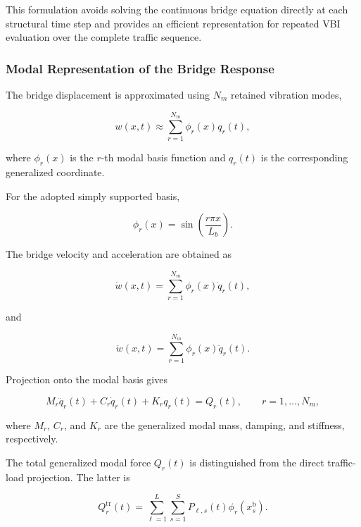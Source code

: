 \documentclass[journal]{IEEEtran}
\begin{document}
This formulation avoids
solving the continuous bridge equation directly at each structural time step
and provides an efficient representation for repeated VBI evaluation over the
complete traffic sequence.



\subsubsection{Modal Representation of the Bridge Response}

The bridge displacement
is approximated using $N_m$ retained vibration
modes,

\begin{equation}
w(x,t)
\approx
\sum_{r=1}^{N_m}
\phi_r(x)q_r(t),
\end{equation}

where $\phi_r(x)$ is the $r$-th modal basis
function and $q_r(t)$ is the corresponding
generalized coordinate.

For the adopted simply
supported basis,

\begin{equation}
\phi_r(x)
=
\sin
\left(
\frac{r\pi x}{L_b}
\right).
\end{equation}

The bridge velocity and
acceleration are obtained as

\begin{equation}
\dot{w}(x,t)
=
\sum_{r=1}^{N_m}
\phi_r(x)\dot{q}_r(t),
\end{equation}

and

\begin{equation}
\ddot{w}(x,t)
=
\sum_{r=1}^{N_m}
\phi_r(x)\ddot{q}_r(t).
\end{equation}

Projection onto the
modal basis gives

\begin{equation}
M_r\ddot{q}_r(t)
+
C_r\dot{q}_r(t)
+
K_rq_r(t)
=
Q_r(t),
\qquad
r=1,\ldots,N_m,
\end{equation}

where $M_r$, $C_r$, and $K_r$ are the generalized
modal mass, damping, and stiffness, respectively.

The total generalized modal force $Q_r(t)$ is distinguished from the
direct traffic-load projection. The latter is

\begin{equation}
Q_r^{\mathrm{tr}}(t)
=
\sum_{\ell=1}^{L}
\sum_{s=1}^{S}
P_{\ell,s}(t)
\phi_r
\left(
x_s^{\mathrm{b}}
\right).
\end{equation}
\end{document}
